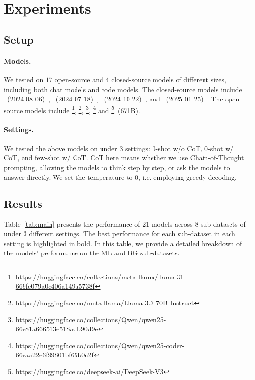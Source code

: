 \section{Experiments}



\subsection{Setup}

\paragraph{Models.} We tested \bench on $17$ open-source and $4$ closed-source models of different sizes, including both chat models and code models. The closed-source models include ~(2024-08-06)~\citep{openai2024gpt4o}, ~(2024-07-18)~\citep{openai2024gpt4omini}, ~(2024-10-22)~\citep{anthropic2024claude35}, and ~(2025-01-25)~\citep{qwen25}. The open-source models include \footnote{\url{https://huggingface.co/collections/meta-llama/llama-31-669fc079a0c406a149a5738f}}, \footnote{\url{https://huggingface.co/meta-llama/Llama-3.3-70B-Instruct}}, \footnote{\url{https://huggingface.co/collections/Qwen/qwen25-66e81a666513e518adb90d9e}}, \footnote{\url{https://huggingface.co/collections/Qwen/qwen25-coder-66eaa22e6f99801bf65b0c2f}} and \footnote{\url{https://huggingface.co/deepseek-ai/DeepSeek-V3}}~(671B).

\paragraph{Settings.} We tested the above models on \bench under 3 settings: 0-shot w/o CoT, 0-shot w/ CoT, and few-shot w/ CoT. CoT here means whether we use Chain-of-Thought~\citep{wei2022chain} prompting, allowing the models to think step by step, or ask the models to answer directly. We set the temperature to $0$, i.e. employing greedy decoding.

\subsection{Results}

Table~\ref{tab:main} presents the performance of 21 models across 8 sub-datasets of \bench under 3 different settings. The best performance for each sub-dataset in each setting is highlighted in bold. In this table, we provide a detailed breakdown of the models' performance on the ML and BG sub-datasets.

